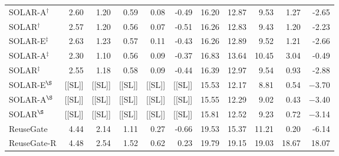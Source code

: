 \begin{tabular}{lrrrrr|rrrrr}
SOLAR-A$^{\dagger}$ & 2.60 & 1.20 & 0.59 & 0.08 & -0.49 & 16.20 & 12.87 & 9.53 & 1.27 & -2.65\\
SOLAR$^{\dagger}$ & 2.57 & 1.20 & 0.56 & 0.07 & -0.51 & 16.26 & 12.83 & 9.43 & 1.20 & -2.23\\
SOLAR-E$^{\ddagger}$ & 2.63 & 1.23 & 0.57 & 0.11 & -0.43 & 16.26 & 12.89 & 9.52 & 1.21 & -2.66\\
SOLAR-A$^{\ddagger}$ & 2.30 & 1.10 & 0.56 & 0.09 & -0.37 & 16.83 & 13.64 & 10.45 & 3.04 & -0.49\\
SOLAR$^{\ddagger}$ & 2.55 & 1.18 & 0.58 & 0.09 & -0.44 & 16.39 & 12.97 & 9.54 & 0.93 & -2.88\\
SOLAR-E$^{\S}$ & [[SL]] & [[SL]] & [[SL]] & [[SL]] & [[SL]] & 15.53 & 12.17 & 8.81 & 0.54 & $-$3.70\\
SOLAR-A$^{\S}$ & [[SL]] & [[SL]] & [[SL]] & [[SL]] & [[SL]] & 15.55 & 12.29 & 9.02 & 0.43 & $-$3.40\\
SOLAR$^{\S}$ & [[SL]] & [[SL]] & [[SL]] & [[SL]] & [[SL]] & 15.81 & 12.52 & 9.23 & 0.72 & $-$3.14\\
ReuseGate & 4.44 & 2.14 & 1.11 & 0.27 & -0.66 & 19.53 & 15.37 & 11.21 & 0.20 & -6.14\\
ReuseGate-R & 4.48 & 2.54 & 1.52 & 0.62 & 0.23 & 19.79 & 19.15 & 19.03 & 18.67 & 18.07\\
\bottomrule
\end{tabular}
